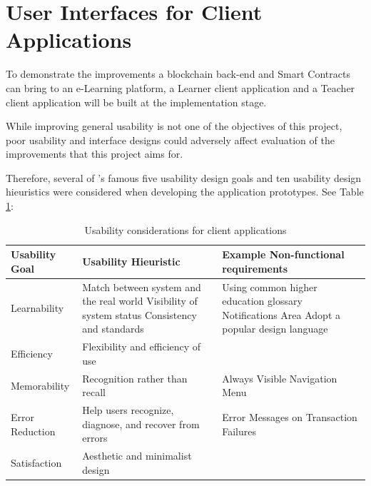 \section{User Interfaces for Client Applications}

To demonstrate the improvements a blockchain back-end and Smart Contracts can bring to an e-Learning platform, a
Learner client application and a Teacher client application will be built at the implementation stage.

While improving general usability is not one of the objectives of this project, poor usability and interface designs
could adversely affect evaluation of the improvements that this project aims for.

Therefore, several of \citet{nielsen199510}'s famous five usability design goals and ten usability design hieuristics
were considered when developing the application prototypes. See Table \ref{table:ux_considerations}:

\begin{table}[!ht]
	\caption{Usability considerations for client applications}
	\centering
	\label{table:ux_considerations}
	\begin{tabularx}{\textwidth}{lXX}
		Usability Goal            & Usability Hieuristic                                    & Example Non-functional requirements    \\
		\toprule
		Learnability              & Match between system and the real world\newline
		Visibility of system status \newline
		Consistency and standards & Using common higher education glossary \newline
		Notifications Area \newline
		Adopt a popular design language                                                                                              \\
		\midrule
		Efficiency                & Flexibility and efficiency of use                                                                \\
		\midrule
		Memorability              & Recognition rather than recall                          & Always Visible Navigation Menu         \\
		\midrule
		Error Reduction        & Help users recognize, diagnose, and recover from errors & Error Messages on Transaction Failures \\
		\midrule
		Satisfaction              & Aesthetic and minimalist design                                                                  \\
		\bottomrule
	\end{tabularx}
\end{table}

